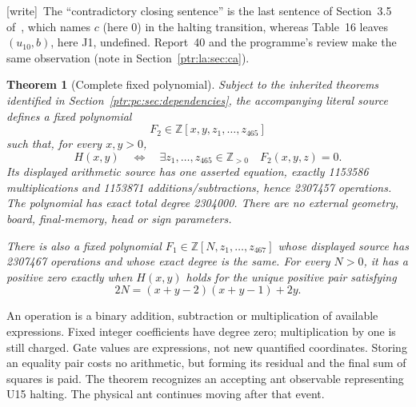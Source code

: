 \documentclass[11pt,letterpaper]{article}
\newtheorem{theorem}{Theorem}[section]
\theoremstyle{definition}\newtheorem{definition}[theorem]{Definition}
\theoremstyle{remark}\newtheorem{remark}[theorem]{Remark}
\newcommand{\Z}{\mathbb Z}\newcommand{\N}{\mathbb N}\newcommand{\Zp}{\mathbb Z_{>0}}
\newcommand{\wtag}{\textup{[write]}}
\begin{document}
{\small\wtag\ The ``contradictory closing sentence'' is the last sentence of
Section~3.5 of~\cite{ptr:pc:nw}, which names $c$ (here 0) in the halting
transition, whereas Table~16 leaves $(u_{10},b)$, here J1, undefined. Report~40
and the programme's review make the same observation (note in
Section~\ref{ptr:la:sec:ca}).\par}

\begin{theorem}[Complete fixed polynomial]\label{ptr:pc:thm:complete}
Subject to the inherited theorems identified in Section~\ref{ptr:pc:sec:dependencies}, the accompanying literal source defines a fixed polynomial
\[
 F_2\in\Z[x,y,z_1,\ldots,z_{465}]
\]
such that, for every $x,y>0$,
\begin{equation}\label{ptr:pc:eq:iff}
 H(x,y)\quad\Longleftrightarrow\quad
 \exists z_1,\ldots,z_{465}\in\Zp\quad F_2(x,y,z)=0.
\end{equation}
Its displayed arithmetic source has one asserted equation, exactly 1153586 multiplications and 1153871 additions/subtractions, hence 2307457 operations. The polynomial has exact total degree 2304000. There are no external geometry, board, final-memory, head or sign parameters.

There is also a fixed polynomial $F_1\in\Z[N,z_1,\ldots,z_{467}]$ whose displayed source has 2307467 operations and whose exact degree is the same. For every $N>0$, it has a positive zero exactly when $H(x,y)$ holds for the unique positive pair satisfying
\begin{equation}\label{ptr:pc:eq:pair}
 2N=(x+y-2)(x+y-1)+2y.
\end{equation}
\end{theorem}
An operation is a binary addition, subtraction or multiplication of available expressions. Fixed integer coefficients have degree zero; multiplication by one is still charged. Gate values are expressions, not new quantified coordinates. Storing an equality pair costs no arithmetic, but forming its residual and the final sum of squares is paid. The theorem recognizes an accepting ant observable representing U15 halting. The physical ant continues moving after that event.

\label{ptr:pc:wr:sizes}
\end{document}
